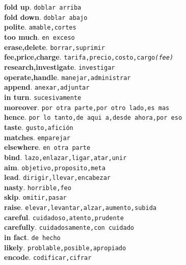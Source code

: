 \documentclass[twocolumn]{article}
\begin{document}
	\textsf{\textbf{fold up}}. \texttt{doblar arriba}\\
	\textsf{\textbf{fold down}}. \texttt{doblar abajo}\\
	\textsf{\textbf{polite}}. \texttt{amable,cortes}\\
	\textsf{\textbf{too much}}. \texttt{en exceso}\\
	\textsf{\textbf{erase,delete}}. \texttt{borrar,suprimir}\\
	\textsf{\textbf{fee,price,charge}}. \texttt{tarifa,precio,costo,cargo{\scriptsize \textit{(fee)}}}\\
	\textsf{\textbf{research,investigate}}. \texttt{investigar}\\
	\textsf{\textbf{operate,handle}}. \texttt{manejar,administrar}\\
	\textsf{\textbf{append}}. \texttt{anexar,adjuntar}\\
	\textsf{\textbf{in turn}}. \texttt{sucesivamente}\\
	\textsf{\textbf{moreover}}. \texttt{por otra parte,por otro lado,es mas}\\
	\textsf{\textbf{hence}}. \texttt{por lo tanto,de aqui a,desde ahora,por eso}\\
	\textsf{\textbf{taste}}. \texttt{gusto,afici\'on}\\
	\textsf{\textbf{matches}}. \texttt{emparejar}\\
	\textsf{\textbf{elsewhere}}. \texttt{en otra parte}\\
	\textsf{\textbf{bind}}. \texttt{lazo,enlazar,ligar,atar,unir}\\
	\textsf{\textbf{aim}}. \texttt{objetivo,proposito,meta}\\
	\textsf{\textbf{lead}}. \texttt{dirigir,llevar,encabezar}\\
	\textsf{\textbf{nasty}}. \texttt{horrible,feo}\\
	\textsf{\textbf{skip}}. \texttt{omitir,pasar}\\
	\textsf{\textbf{raise}}. \texttt{elevar,levantar,alzar,aumento,subida}\\
	\textsf{\textbf{careful}}. \texttt{cuidadoso,atento,prudente}\\
	\textsf{\textbf{carefully}}. \texttt{cuidadosamente,con cuidado}\\
	\textsf{\textbf{in fact}}. \texttt{de hecho}\\
	\textsf{\textbf{likely}}. \texttt{problable,posible,apropiado}\\
	\textsf{\textbf{encode}}. \texttt{codificar,cifrar}\\
\end{document}
